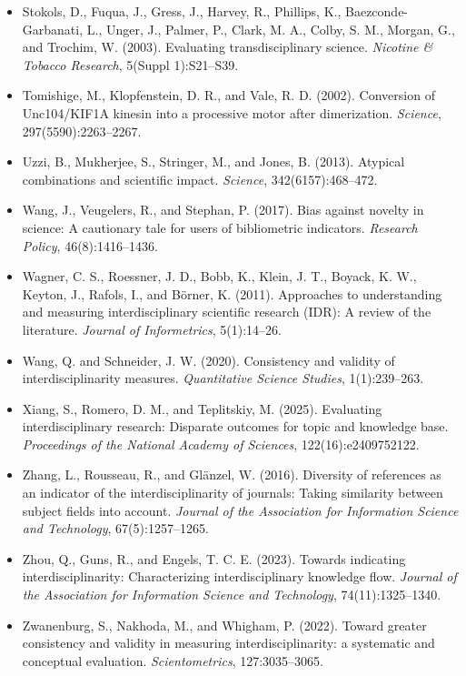 \documentclass[
]{article}
\begin{document}
\begin{itemize}
  Stirling, A. (2007). A general framework for analysing diversity in
  science, technology and society. \emph{Journal of the Royal Society
  Interface}, 4(15):707--719.
\item
  Stokols, D., Fuqua, J., Gress, J., Harvey, R., Phillips, K.,
  Baezconde-Garbanati, L., Unger, J., Palmer, P., Clark, M. A., Colby,
  S. M., Morgan, G., and Trochim, W. (2003). Evaluating
  transdisciplinary science. \emph{Nicotine \& Tobacco Research},
  5(Suppl 1):S21--S39.
\item
  Tomishige, M., Klopfenstein, D. R., and Vale, R. D. (2002). Conversion
  of Unc104/KIF1A kinesin into a processive motor after dimerization.
  \emph{Science}, 297(5590):2263--2267.
\item
  Uzzi, B., Mukherjee, S., Stringer, M., and Jones, B. (2013). Atypical
  combinations and scientific impact. \emph{Science},
  342(6157):468--472.
\item
  Wang, J., Veugelers, R., and Stephan, P. (2017). Bias against novelty
  in science: A cautionary tale for users of bibliometric indicators.
  \emph{Research Policy}, 46(8):1416--1436.
\item
  Wagner, C. S., Roessner, J. D., Bobb, K., Klein, J. T., Boyack, K. W.,
  Keyton, J., Rafols, I., and Börner, K. (2011). Approaches to
  understanding and measuring interdisciplinary scientific research
  (IDR): A review of the literature. \emph{Journal of Informetrics},
  5(1):14--26.
\item
  Wang, Q. and Schneider, J. W. (2020). Consistency and validity of
  interdisciplinarity measures. \emph{Quantitative Science Studies},
  1(1):239--263.
\item
  Xiang, S., Romero, D. M., and Teplitskiy, M. (2025). Evaluating
  interdisciplinary research: Disparate outcomes for topic and knowledge
  base. \emph{Proceedings of the National Academy of Sciences},
  122(16):e2409752122.
\item
  Zhang, L., Rousseau, R., and Glänzel, W. (2016). Diversity of
  references as an indicator of the interdisciplinarity of journals:
  Taking similarity between subject fields into account. \emph{Journal
  of the Association for Information Science and Technology},
  67(5):1257--1265.
\item
  Zhou, Q., Guns, R., and Engels, T. C. E. (2023). Towards indicating
  interdisciplinarity: Characterizing interdisciplinary knowledge flow.
  \emph{Journal of the Association for Information Science and
  Technology}, 74(11):1325--1340.
\item
  Zwanenburg, S., Nakhoda, M., and Whigham, P. (2022). Toward greater
  consistency and validity in measuring interdisciplinarity: a
  systematic and conceptual evaluation. \emph{Scientometrics},
  127:3035--3065.
\end{itemize}
\end{document}

